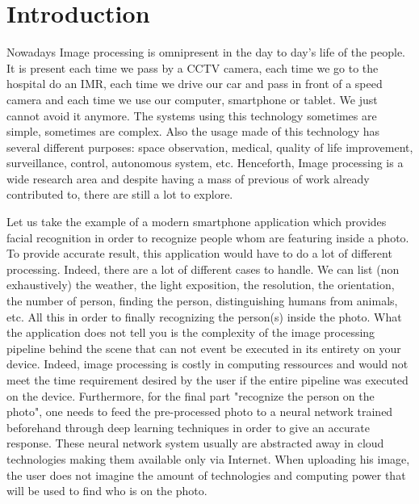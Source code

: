 \chapter*{Introduction}
\label{introduction.chap.introduction}

Nowadays Image processing is omnipresent in the day to day's life of the people. It is present each time we pass by a
CCTV camera, each time we go to the hospital do an IMR, each time we drive our car and pass in front of a speed camera
and each time we use our computer, smartphone or tablet. We just cannot avoid it anymore. The systems using this
technology sometimes are simple, sometimes are complex. Also the usage made of this technology has several different
purposes: space observation, medical, quality of life improvement, surveillance, control, autonomous system, etc.
Henceforth, Image processing is a wide research area and despite having a mass of previous of work already contributed
to, there are still a lot to explore.

Let us take the example of a modern smartphone application which provides facial recognition in order to recognize
people whom are featuring inside a photo. To provide accurate result, this application would have to do a lot of
different processing. Indeed, there are a lot of different cases to handle. We can list (non exhaustively) the weather,
the light exposition, the resolution, the orientation, the number of person, finding the person, distinguishing humans
from animals, etc. All this in order to finally recognizing the person(s) inside the photo. What the application does
not tell you is the complexity of the image processing pipeline behind the scene that can not event be executed in its
entirety on your device. Indeed, image processing is costly in computing ressources and would not meet the time
requirement desired by the user if the entire pipeline was executed on the device. Furthermore, for the final part
"recognize the person on the photo", one needs to feed the pre-processed photo to a neural network trained beforehand
through deep learning techniques in order to give an accurate response. These neural network system usually are
abstracted away in cloud technologies making them available only via Internet. When uploading his image, the user does
not imagine the amount of technologies and computing power that will be used to find who is on the photo.

